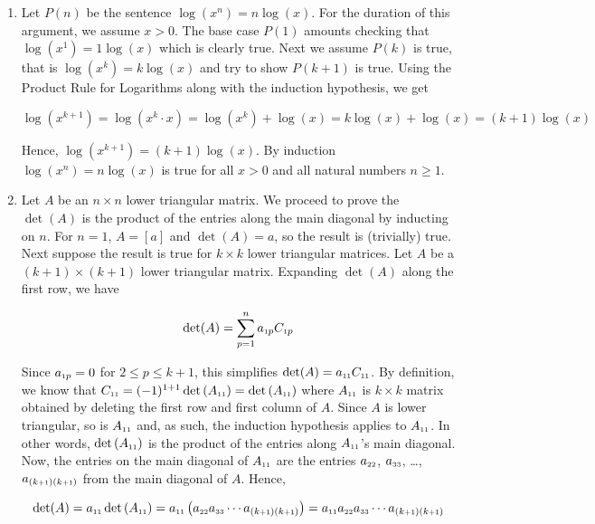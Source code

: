 \begin{enumerate}
\addtocounter{enumi}{1}

\item  Let $P(n)$ be the sentence $\log\left(x^n \right) = n \log(x)$.  For the duration of this argument, we assume $x > 0$. The base case $P(1)$ amounts checking that $\log\left(x^1\right) = 1 \log(x)$ which is clearly true.  Next we assume $P(k)$ is true, that is $\log\left(x^{k}\right) = k \log(x)$ and try to show $P(k+1)$ is true.  Using the Product Rule for Logarithms along with the induction hypothesis, we get

 \[\log\left(x^{k+1}\right) = \log\left(x^{k} \cdot x\right) = \log\left(x^{k}\right) + \log(x) = k \log(x) + \log(x) = (k+1) \log(x) \]
 
 Hence, $\log\left(x^{k+1}\right) = (k+1) \log(x)$.  By induction  $\log\left(x^n \right) = n \log(x)$ is true for all $x>0$ and all natural numbers $n \geq 1$.


\addtocounter{enumi}{2}

\item  Let $A$ be an $n \times n$ lower triangular matrix.  We proceed to prove the $\det(A)$ is the product of the entries along the main diagonal by inducting on $n$.  For $n=1$, $A = [a]$ and $\det(A) = a$, so the result is (trivially) true.  Next suppose the result is true for $k \times k$ lower triangular matrices.  Let $A$ be a $(k+1) \times (k+1)$ lower triangular matrix.  Expanding $\det(A)$ along the first row, we have

\[ \det(A)  = \displaystyle{\sum_{p=1}^{n} a_{\mbox{\tiny$1$}p} C_{\mbox{\tiny$1$}p}} \]

Since $a_{\mbox{\tiny$1$}p} = 0$ for $2 \leq p \leq k+1$, this simplifies $\det(A) = a_{\mbox{\tiny$11$}}C_{\mbox{\tiny$11$}}$.  By definition, we know that $C_{\mbox{\tiny$11$}} = (-1)^{1+1} \det\left(A_{\mbox{\tiny$11$}}\right) =\det\left(A_{\mbox{\tiny$11$}}\right)$ where $A_{\mbox{\tiny$11$}}$ is $k \times k$  matrix obtained by deleting the first row and first column of $A$. Since $A$ is lower triangular, so is $A_{\mbox{\tiny$11$}}$ and, as such, the induction hypothesis applies to $A_{\mbox{\tiny$11$}}$. In other words, $\det\left(A_{\mbox{\tiny$11$}}\right)$ is the product of the entries along $A_{\mbox{\tiny$11$}}$'s main diagonal.  Now, the entries on the main diagonal of $A_{\mbox{\tiny$11$}}$ are the entries $a_{\mbox{\tiny$22$}}$, $a_{\mbox{\tiny$33$}}$, \ldots, $a_{(k\mbox{\tiny$+1$})(k\mbox{\tiny$+1$})}$ from the main diagonal of $A$.  Hence,

\[ \det(A) = a_{\mbox{\tiny$11$}} \det\left(A_{\mbox{\tiny$11$}}\right) = a_{\mbox{\tiny$11$}} \left(a_{\mbox{\tiny$22$}}a_{\mbox{\tiny$33$}} \cdots a_{(k\mbox{\tiny$+1$})(k\mbox{\tiny$+1$})} \right) = a_{\mbox{\tiny$11$}} a_{\mbox{\tiny$22$}}a_{\mbox{\tiny$33$}} \cdots a_{(k\mbox{\tiny$+1$})(k\mbox{\tiny$+1$})}\]


\end{enumerate}
